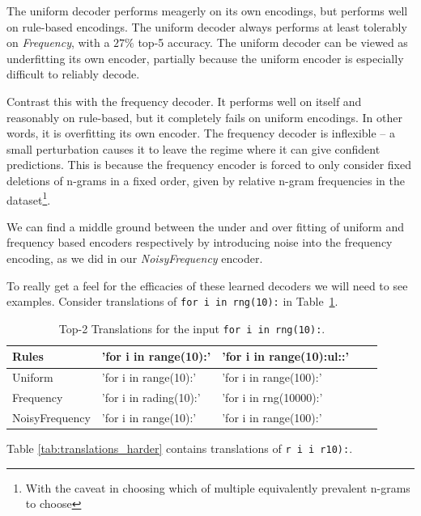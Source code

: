 \documentclass{article}
\begin{document}
The uniform decoder performs meagerly on its own encodings, but performs well on rule-based encodings. The uniform decoder always performs at least tolerably on \emph{Frequency},
with a $27\%$ top-5 accuracy. The uniform decoder can be viewed as underfitting its own encoder, partially because the uniform encoder is especially difficult to reliably decode.

Contrast this with the frequency decoder. It performs well on itself and reasonably on rule-based, but it completely fails on uniform encodings. In other words, it is overfitting its own encoder. The frequency decoder is inflexible -- a small perturbation causes it to leave the regime where it can give confident predictions. This is because the frequency encoder is forced to only consider fixed deletions of n-grams in a fixed order, given by relative n-gram frequencies in the dataset\footnote{With the caveat in choosing which of multiple equivalently prevalent n-grams to choose}.

We can find a middle ground between the under and over fitting of uniform and frequency based encoders respectively by introducing noise into the frequency encoding, as we did in our \emph{NoisyFrequency} encoder.

To really get a feel for the efficacies of these learned decoders we will need to see examples.
Consider translations of \texttt{for i in rng(10):} in
Table~\ref{tab:translations}.

\begin{table}[h!]
\centering
\begin{tabular}{|l|l|l|l|l|}
\hline
Rules  & 'for i in range(10):' & 'for i in range(10):ul::' \\ \hline
Uniform  & 'for i in range(10):' & 'for i in range(100):'    \\ \hline
Frequency  & 'for i in rading(10):' & 'for i in rng(10000):'   \\ \hline
NoisyFrequency & 'for i in range(10):' & 'for i in range(100):'    \\ \hline
\end{tabular}
\bigskip
\caption{Top-2 Translations for the input \texttt{for i in rng(10):}.
}
\label{tab:translations}
\end{table}

Table \ref{tab:translations_harder} contains translations of \texttt{r i i r10):}.
\end{document}
